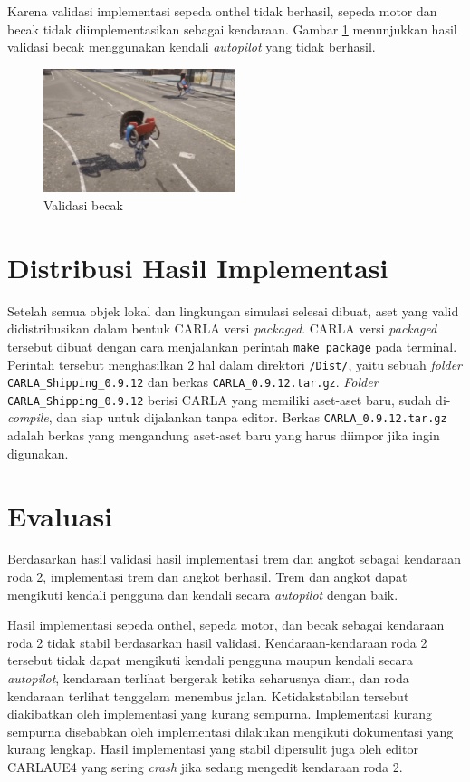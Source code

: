 Karena validasi implementasi sepeda onthel tidak berhasil, sepeda motor dan
becak tidak diimplementasikan sebagai kendaraan. Gambar
\ref{fig:becak-validation} menunjukkan hasil validasi becak menggunakan kendali
\textit{autopilot} yang tidak berhasil.

\begin{figure}[!h]
    \centering
    \includegraphics[width=0.5\textwidth]{resources/chapter-4/testing-becak-generate.png}
    \caption{Validasi becak}
    \label{fig:becak-validation}
\end{figure}

\section{Distribusi Hasil Implementasi}

Setelah semua objek lokal dan lingkungan simulasi selesai dibuat, aset yang
valid didistribusikan dalam bentuk CARLA versi \textit{packaged}. CARLA versi
\textit{packaged} tersebut dibuat dengan cara menjalankan perintah \verb|make package|
pada terminal. Perintah tersebut menghasilkan 2 hal dalam direktori
\verb|/Dist/|, yaitu sebuah \textit{folder} \verb|CARLA_Shipping_0.9.12| dan
berkas \verb|CARLA_0.9.12.tar.gz|. \textit{Folder} \verb|CARLA_Shipping_0.9.12|
berisi CARLA yang memiliki aset-aset baru, sudah di-\textit{compile}, dan siap
untuk dijalankan tanpa editor. Berkas \verb|CARLA_0.9.12.tar.gz| adalah berkas
yang mengandung aset-aset baru yang harus diimpor jika ingin digunakan.

\section{Evaluasi}

Berdasarkan hasil validasi hasil implementasi trem dan angkot sebagai kendaraan
roda 2, implementasi trem dan angkot berhasil. Trem dan angkot dapat mengikuti
kendali pengguna dan kendali secara \textit{autopilot} dengan baik.

Hasil implementasi sepeda onthel, sepeda motor, dan becak sebagai kendaraan roda
2 tidak stabil berdasarkan hasil validasi. Kendaraan-kendaraan roda 2 tersebut
tidak dapat mengikuti kendali pengguna maupun kendali secara \textit{autopilot},
kendaraan terlihat bergerak ketika seharusnya diam, dan roda kendaraan terlihat
tenggelam menembus jalan. Ketidakstabilan tersebut diakibatkan oleh implementasi
yang kurang sempurna. Implementasi kurang sempurna disebabkan oleh implementasi
dilakukan mengikuti dokumentasi yang kurang lengkap. Hasil implementasi yang
stabil dipersulit juga oleh editor CARLAUE4 yang sering \textit{crash} jika
sedang mengedit kendaraan roda 2.

